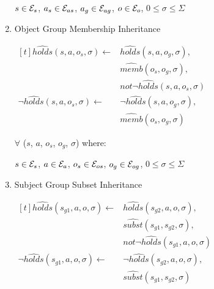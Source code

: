 \documentclass[10pt, twocolumn]{article}
\begin{document}
\begin{enumerate}
                $s \in {\cal E}_{s}$,
                $a_{s} \in {\cal E}_{as}$,
                $a_{g} \in {\cal E}_{ag}$,
                $o \in {\cal E}_{o}$,
                $0 \leq \sigma \leq \Sigma$

              \item
                Object Group Membership Inheritance

                \begin{math}
                  \begin{aligned}[t]
                    \hat{holds}(s, a, o_{s}, \sigma) \leftarrow &
                    \hat{holds}(s, a, o_{g}, \sigma), \\
                    & \hat{memb}(o_{s}, o_{g}, \sigma), \\
                    & not \lnot \hat{holds}(s, a, o_{s}, \sigma) \\
                    \lnot \hat{holds}(s, a, o_{s}, \sigma) \leftarrow &
                    \lnot \hat{holds}(s, a, o_{g}, \sigma), \\
                    & \hat{memb}(o_{s}, o_{g}, \sigma)
                  \end{aligned}
                \end{math}

                $\forall$ ($s$, $a$, $o_{s}$, $o_{g}$, $\sigma$) where:

                $s \in {\cal E}_{s}$,
                $a \in {\cal E}_{a}$,
                $o_{s} \in {\cal E}_{os}$,
                $o_{g} \in {\cal E}_{og}$,
                $0 \leq \sigma \leq \Sigma$

              \item
                Subject Group Subset Inheritance

                \begin{math}
                  \begin{aligned}[t]
                    \hat{holds}(s_{g1}, a, o, \sigma) \leftarrow &
                    \hat{holds}(s_{g2}, a, o, \sigma), \\
                    & \hat{subst}(s_{g1}, s_{g2}, \sigma), \\
                    & not \lnot \hat{holds}(s_{g1}, a, o, \sigma) \\
                    \lnot \hat{holds}(s_{g1}, a, o, \sigma) \leftarrow &
                    \lnot \hat{holds}(s_{g2}, a, o, \sigma), \\
                    & \hat{subst}(s_{g1}, s_{g2}, \sigma)
                  \end{aligned}
                \end{math}


\end{enumerate}
\end{document}

